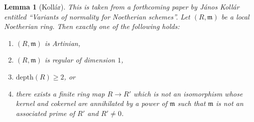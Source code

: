 \documentclass{amsart}
\newenvironment{reference}{\comment}{\endcomment}
\theoremstyle{plain}
\newtheorem{lemma}[subsection]{Lemma}
\theoremstyle{definition}
\theoremstyle{remark}
\numberwithin{equation}{subsection}
\begin{document}
\begin{lemma}[Koll\'ar]
\label{lemma-hart-serre-loc-thm}
\begin{reference}
This is taken from a forthcoming paper by
J\'anos Koll\'ar entitled ``Variants of normality for Noetherian schemes''.
\end{reference}
Let $(R, \mathfrak m)$ be a local Noetherian ring.
Then exactly one of the following holds:
\begin{enumerate}
\item $(R, \mathfrak m)$ is Artinian,
\item $(R, \mathfrak m)$ is regular of dimension $1$,
\item $\text{depth}(R) \geq 2$, or
\item there exists a finite ring map $R \to R'$ which is not
an isomorphism whose kernel and cokernel are annihilated by a power
of $\mathfrak m$ such that $\mathfrak m$ is not an associated
prime of $R'$ and $R' \not = 0$.
\end{enumerate}
\end{lemma}
\end{document}
